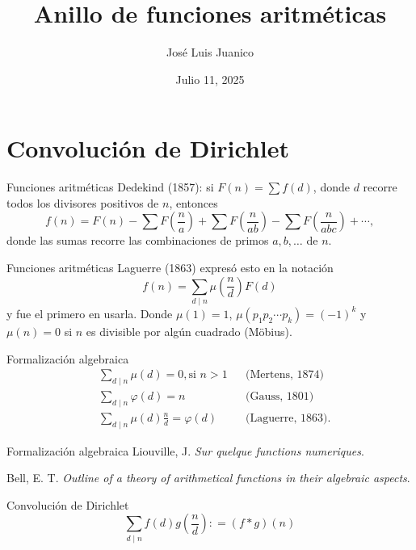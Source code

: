 \documentclass{beamer}
\title{Anillo de funciones aritméticas}
\author{José Luis Juanico}
\date{Julio 11, 2025}
\institute{ESFM-IPN}
\begin{document}
\maketitle
\pagestyle{empty}

\section{Convolución de Dirichlet}
\begin{frame}{Funciones aritméticas}
    Dedekind (1857): si $F(n) = \sum f(d)$, donde $d$ recorre todos los divisores positivos de $n$, entonces
    \begin{equation*}
        f(n) = F(n) - \sum F \left( \frac{n}{a} \right) + \sum F \left( \frac{n}{a b} \right) - \sum F \left( \frac{n}{a b c} \right) + \cdots,
    \end{equation*}
    donde las sumas recorre las combinaciones de primos $a, b, \ldots$ de $n$.
\end{frame}

\begin{frame}{Funciones aritméticas}
    Laguerre (1863) expresó esto en la notación
    \begin{equation*}
        f(n) = \sum_{d \mid n} \mu \left( \frac{n}{d} \right) F(d)
    \end{equation*}
    y fue el primero en usarla. Donde $\mu(1) = 1$, $\mu(p_1 p_2 \cdots p_k) = (-1)^k$ y $\mu(n) = 0$ si $n$ es divisible por algún cuadrado (Möbius).
\end{frame}

\begin{frame}{Formalización algebraica}
    \begin{align*}
        & \sum_{d \mid n} \mu(d) = 0, \text{si } n > 1 && \text{(Mertens, 1874)} \\
        & \sum_{d \mid n} \varphi(d) = n && \text{(Gauss, 1801)} \\
        & \sum_{d \mid n} \mu(d) \frac{n}{d} = \varphi(d) && \text{(Laguerre, 1863)}.
    \end{align*}
\end{frame}

\begin{frame}{Formalización algebraica}
    Liouville, J. \emph{Sur quelque functions numeriques}.

    Bell, E. T. \emph{Outline of a theory of arithmetical functions in their algebraic aspects}.
\end{frame}

\begin{frame}{Convolución de Dirichlet}
    \begin{equation*}
        \sum_{d \mid n} f(d) g \left( \frac{n}{d} \right) : = (f * g)(n)
    \end{equation*}
\end{frame}
\end{document}
